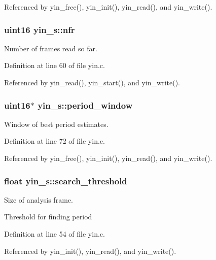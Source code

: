 Referenced by yin\-\_\-free(), yin\-\_\-init(), yin\-\_\-read(), and yin\-\_\-write().

\subsubsection[{nfr}]{\setlength{\rightskip}{0pt plus 5cm}uint16 yin\-\_\-s\-::nfr}\label{structyin__s_af4f11d14a36bbdc19863fa8335237423}


Number of frames read so far. 



Definition at line 60 of file yin.\-c.



Referenced by yin\-\_\-read(), yin\-\_\-start(), and yin\-\_\-write().

\subsubsection[{period\-\_\-window}]{\setlength{\rightskip}{0pt plus 5cm}uint16$\ast$ yin\-\_\-s\-::period\-\_\-window}\label{structyin__s_a1928cec127e250f6cd15249085bc9fc8}


Window of best period estimates. 



Definition at line 72 of file yin.\-c.



Referenced by yin\-\_\-free(), yin\-\_\-init(), yin\-\_\-read(), and yin\-\_\-write().

\subsubsection[{search\-\_\-threshold}]{\setlength{\rightskip}{0pt plus 5cm}float yin\-\_\-s\-::search\-\_\-threshold}\label{structyin__s_a48c5ec4512b28c565a6daee092dd87f3}


Size of analysis frame. 

Threshold for finding period 

Definition at line 54 of file yin.\-c.



Referenced by yin\-\_\-init(), yin\-\_\-read(), and yin\-\_\-write().

